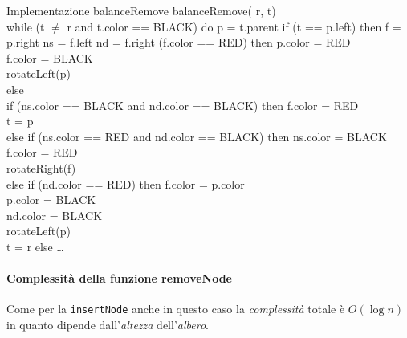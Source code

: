 \begin{minicode}{Implementazione balanceRemove}
\ind balanceRemove( r,  t)\\
    \indf while (t $\neq$ r and t.color == BLACK) do\hfill{}
    \mbox{}\hfill{}
     p = t.parent\hfill{}
    \indff if (t == p.left) then\hfill{}
         f = p.right\hfill{}
         ns = f.left\hfill{}
         nd = f.right\hfill{}
        \indfff (f.color == RED) then\hfill{}
            p.color = RED\\
            f.color = BLACK\\
            rotateLeft(p)\\
        \indfff else\\
            \indffff if (ns.color == BLACK and nd.color == BLACK) then\hfill{}
                f.color = RED\\
                t = p\\
            \indffff else if (ns.color == RED and nd.color == BLACK) then\hfill{}
                ns.color = BLACK\\
                f.color = RED\\
                rotateRight(f)\\
            \indffff else if (nd.color == RED) then\hfill{}
                f.color = p.color\\
                p.color = BLACK\\
                nd.color = BLACK\\
                rotateLeft(p)\\
                t = r\hfill{}
    \indff else\hfill{}
        \dots
\end{minicode}

\paragraph{Complessità della funzione removeNode}
Come per la \texttt{insertNode} anche in questo caso la \emph{complessità}
totale è $O(\log n)$ in quanto dipende dall'\emph{altezza} dell'\emph{albero}.